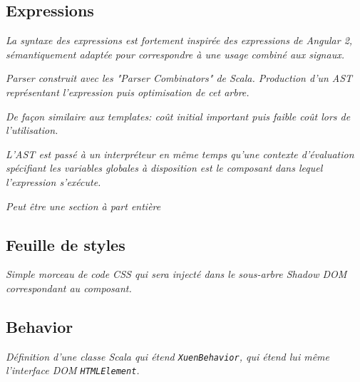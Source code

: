 \subsection{Expressions}
\textit{La syntaxe des expressions est fortement inspirée des expressions de Angular 2, sémantiquement adaptée pour correspondre à une usage combiné aux signaux.}

\textit{Parser construit avec les "Parser Combinators" de Scala. Production d'un AST représentant l'expression puis optimisation de cet arbre.}

\textit{De façon similaire aux templates: coût initial important puis faible coût lors de l'utilisation.}

\textit{L'AST est passé à un interpréteur en même temps qu'une contexte d'évaluation spécifiant les variables globales à disposition est le composant dans lequel l'expression s'exécute.}

\textit{Peut être une section à part entière}

\subsection{Feuille de styles}
\textit{Simple morceau de code CSS qui sera injecté dans le sous-arbre Shadow DOM correspondant au composant.}

\subsection{Behavior}
\textit{Définition d'une classe Scala qui étend \texttt{XuenBehavior}, qui étend lui même l'interface DOM \texttt{HTMLElement}.}